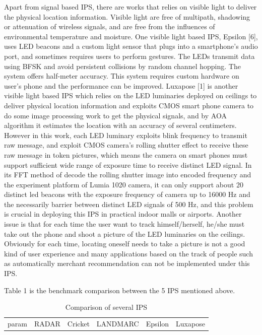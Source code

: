 \documentclass[conference]{IEEEtran}
\begin{document}
Apart from signal based IPS, there are works that relies on visible light to deliver the physical location information. Visible light are free of multipath, shadowing or attenuation of wireless signals, and are free from the influences of environmental temperature and moisture. 
One visible light based IPS, Epsilon [6], uses LED beacons and a custom light sensor that plugs into a smartphone’s audio port, and sometimes requires users to perform gestures. The LEDs transmit data using BFSK and avoid persistent collisions by random channel hopping. The system offers half-meter accuracy. This system requires custom hardware on user's phone and the performance can be improved.
Luxapose [1] is another visible light based IPS which relies on the LED luminaries deployed on ceilings to deliver physical location information and exploits CMOS smart phone camera to do some image processing work to get the physical signals, and by AOA algorithm it estimates the location with an accuracy of several centimeters. However in this work, each LED luminary exploits blink frequency to transmit raw message, and exploit CMOS camera's rolling shutter effect to receive these raw message in token pictures, which means the camera on smart phones must support sufficient wide range of exposure time to receive distinct LED signal. In its FFT method of decode the rolling shutter image into encoded frequency and the experiment platform of Lumia 1020 camera, it can only support about 20 distinct led beacons with the exposure frequency of camera up to 16000 Hz and the necessarily barrier between distinct LED signals of 500 Hz, and this problem is crucial in deploying this IPS in practical indoor malls or airports. Another issue is that for each time the user want to track himself/herself, he/she must take out the phone and shoot a picture of the LED luminaries on the ceilings. Obviously for each time, locating oneself needs to take a picture is not a good kind of user experience and many applications based on the track of people such as automatically merchant recommendation can not be implemented under this IPS. 

Table 1 is the benchmark comparison between the 5 IPS mentioned above.
	\begin{table}[!hbp]
	\begin{tabular}{|c|c|c|c|c|c|}
		
		\hline
		param & RADAR & Cricket & LANDMARC & Epsilon & Luxapose
		
	\end{tabular}
	\caption{Comparison of several IPS}
	\end{table}
	
\end{document}
